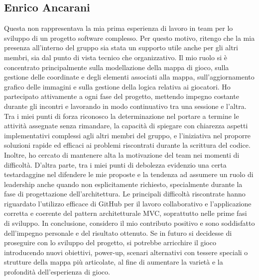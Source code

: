 \documentclass[a4paper,12pt]{report}
\begin{document}
\subsection{Enrico Ancarani}
Questa non rappresentava la mia prima esperienza di lavoro in team per lo sviluppo di un progetto software complesso. 
Per questo motivo, ritengo che la mia presenza all'interno del gruppo sia stata un supporto utile anche per gli altri membri, sia dal punto di vista tecnico che organizzativo.
Il mio ruolo si è concentrato principalmente sulla modellazione della mappa di gioco, sulla gestione delle coordinate e degli elementi associati alla mappa, 
sull’aggiornamento grafico delle immagini e sulla gestione della logica relativa ai giocatori. Ho partecipato attivamente a ogni fase del progetto, mettendo impegno 
costante durante gli incontri e lavorando in modo continuativo tra una sessione e l’altra.
Tra i miei punti di forza riconosco la determinazione nel portare a termine le attività assegnate senza rimandare, la capacità di spiegare con chiarezza aspetti 
implementativi complessi agli altri membri del gruppo, e l'iniziativa nel proporre soluzioni rapide ed efficaci ai problemi riscontrati durante la scrittura del codice. 
Inoltre, ho cercato di mantenere alta la motivazione del team nei momenti di difficoltà.
D’altra parte, tra i miei punti di debolezza evidenzio una certa testardaggine nel difendere le mie proposte e la tendenza ad assumere un ruolo di leadership anche 
quando non esplicitamente richiesto, specialmente durante la fase di progettazione dell’architettura.
Le principali difficoltà riscontrate hanno riguardato l’utilizzo efficace di GitHub per il lavoro collaborativo e l’applicazione corretta e coerente del pattern 
architetturale MVC, soprattutto nelle prime fasi di sviluppo.
In conclusione, considero il mio contributo positivo e sono soddisfatto dell’impegno personale e del risultato ottenuto. 
Se in futuro si decidesse di proseguire con lo sviluppo del progetto, si potrebbe arricchire il gioco introducendo nuovi obiettivi, 
power-up, scenari alternativi con tessere speciali o strutture della mappa più articolate, al fine di aumentare la varietà e la profondità dell’esperienza di gioco.
\end{document}
